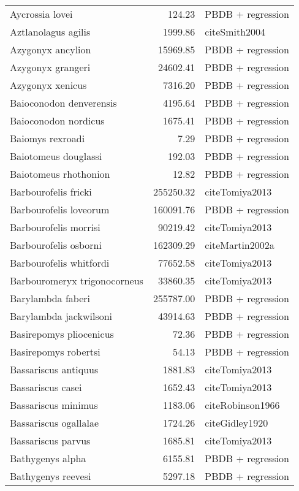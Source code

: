 \begin{table}[ht]
\begin{tabular}{lrl}
  Aycrossia lovei & 124.23 & PBDB + regression \\ 
  Aztlanolagus agilis & 1999.86 & cite{Smith2004} \\ 
  Azygonyx ancylion & 15969.85 & PBDB + regression \\ 
  Azygonyx grangeri & 24602.41 & PBDB + regression \\ 
  Azygonyx xenicus & 7316.20 & PBDB + regression \\ 
  Baioconodon denverensis & 4195.64 & PBDB + regression \\ 
  Baioconodon nordicus & 1675.41 & PBDB + regression \\ 
  Baiomys rexroadi & 7.29 & PBDB + regression \\ 
  Baiotomeus douglassi & 192.03 & PBDB + regression \\ 
  Baiotomeus rhothonion & 12.82 & PBDB + regression \\ 
  Barbourofelis fricki & 255250.32 & cite{Tomiya2013} \\ 
  Barbourofelis loveorum & 160091.76 & PBDB + regression \\ 
  Barbourofelis morrisi & 90219.42 & cite{Tomiya2013} \\ 
  Barbourofelis osborni & 162309.29 & cite{Martin2002a} \\ 
  Barbourofelis whitfordi & 77652.58 & cite{Tomiya2013} \\ 
  Barbouromeryx trigonocorneus & 33860.35 & cite{Tomiya2013} \\ 
  Barylambda faberi & 255787.00 & PBDB + regression \\ 
  Barylambda jackwilsoni & 43914.63 & PBDB + regression \\ 
  Basirepomys pliocenicus & 72.36 & PBDB + regression \\ 
  Basirepomys robertsi & 54.13 & PBDB + regression \\ 
  Bassariscus antiquus & 1881.83 & cite{Tomiya2013} \\ 
  Bassariscus casei & 1652.43 & cite{Tomiya2013} \\ 
  Bassariscus minimus & 1183.06 & cite{Robinson1966} \\ 
  Bassariscus ogallalae & 1724.26 & cite{Gidley1920} \\ 
  Bassariscus parvus & 1685.81 & cite{Tomiya2013} \\ 
  Bathygenys alpha & 6155.81 & PBDB + regression \\ 
  Bathygenys reevesi & 5297.18 & PBDB + regression \\ 

\end{tabular}
\end{table}
